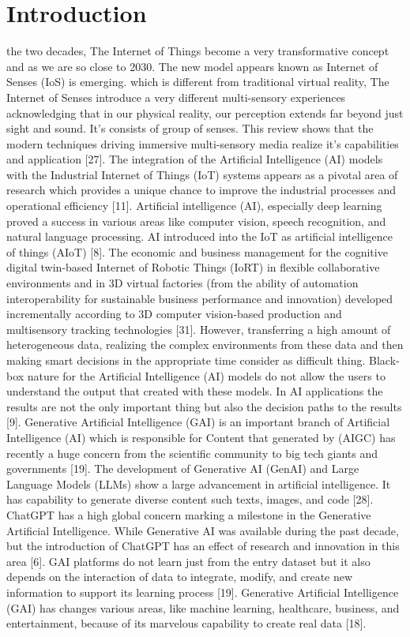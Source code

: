 \documentclass[journal]{IEEEtran}
\begin{document}
\section{Introduction}
 the two decades, The Internet of Things become a very transformative concept and as we are so close to 2030. The new model appears known as Internet of Senses (IoS) is emerging. which is different from traditional virtual reality, The Internet of Senses introduce a very different multi-sensory experiences acknowledging that in our physical reality, our perception extends far beyond just sight and sound. It's consists of group of senses. This review shows that the modern techniques driving immersive multi-sensory media realize it's capabilities and application [27]. The integration of the Artificial Intelligence (AI) models with the Industrial Internet of Things (IoT) systems appears as a pivotal area of research which provides a unique chance to improve the industrial processes and operational efficiency [11]. Artificial intelligence (AI), especially deep learning proved a success in various areas like computer vision, speech recognition, and natural language processing. AI introduced into the IoT as artificial intelligence of things (AIoT) [8].
The economic and business management for the cognitive digital twin-based Internet of Robotic Things (IoRT) in flexible collaborative environments and in 3D virtual factories (from the ability of automation interoperability for sustainable business performance and innovation) developed incrementally according to 3D computer vision-based production and multisensory tracking technologies [31]. However, transferring a high amount of heterogeneous data, realizing the complex environments from these data and then making smart decisions in the appropriate time consider as difficult thing. Black-box nature for the Artificial Intelligence (AI) models do not allow the users to understand the output that created with these models. In AI applications the results are not the only important thing but also the decision paths to the results [9].
Generative Artificial Intelligence (GAI) is an important branch of Artificial Intelligence (AI) which is responsible for Content that generated by (AIGC) has recently a huge concern from the scientific community to big tech giants and governments [19]. The development of Generative AI (GenAI) and Large Language Models (LLMs) show a large advancement in artificial intelligence. It has capability to generate diverse content such texts, images, and code [28]. ChatGPT has a high global concern marking a milestone in the Generative Artificial Intelligence. While Generative AI was available during the past decade, but the introduction of ChatGPT has an effect of research and innovation in this area [6]. GAI platforms do not learn just from the entry dataset but it also depends on the interaction of data to integrate, modify, and create new information to support its learning process [19]. Generative Artificial Intelligence (GAI) has changes various areas, like machine learning, healthcare, business, and entertainment, because of its marvelous capability to create real data [18].
\end{document}
